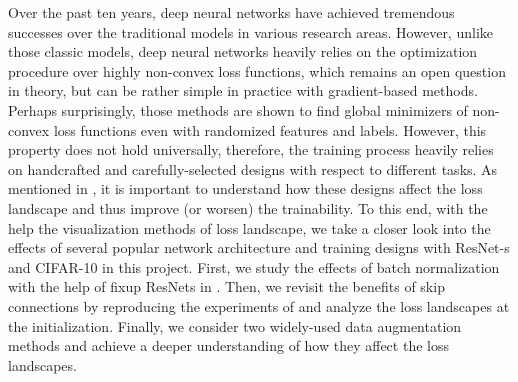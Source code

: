 


Over the past ten years, deep neural networks have achieved tremendous successes over the traditional models in various research areas.  
However, unlike those classic models, deep neural networks heavily relies on the optimization procedure over highly non-convex loss functions, which remains an open question in theory, but can be rather simple in practice with gradient-based methods.  
Perhaps surprisingly, those methods are shown to find global minimizers of non-convex loss functions even with randomized features and labels. 
However, this property does not hold universally, therefore, the training process heavily relies on handcrafted and carefully-selected designs with respect to different tasks. 
As mentioned in \cite{li2018visualizing}, it is important to understand how these designs affect the loss landscape and thus improve (or worsen) the trainability. 
To this end, with the help the visualization methods of loss landscape,  we take a closer look into the effects of several popular network architecture and training designs with ResNet-s and CIFAR-10 in this project.  
First, we study the effects of batch normalization with the help of fixup ResNets in \cite{zhang2018fixup}.
Then, we revisit the benefits of skip connections by reproducing the experiments of \cite{li2018visualizing} and analyze the loss landscapes at the initialization.
Finally, we consider two widely-used data augmentation methods and achieve a deeper understanding of how they affect the loss landscapes.
